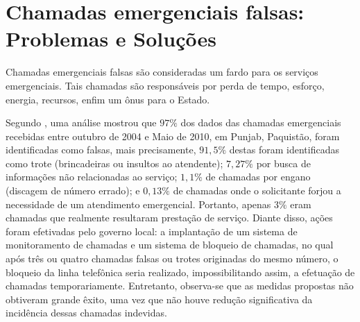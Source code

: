 \section{Chamadas emergenciais falsas: Problemas e Soluções}
Chamadas emergenciais falsas são consideradas um fardo para os serviços emergenciais. Tais chamadas são responsáveis por perda de tempo, esforço, energia, recursos, enfim um ônus para o Estado.

Segundo \cite{waseem2010prank}, uma análise mostrou que $97\%$ dos dados das chamadas emergenciais recebidas entre outubro de 2004 e Maio de 2010, em Punjab, Paquistão, foram identificadas como falsas, mais precisamente, $91,5\%$ destas foram identificadas como trote (brincadeiras ou insultos ao atendente); $7,27\%$ por busca de informações não relacionadas ao serviço; $1,1\%$ de chamadas por engano (discagem de número errado); e $0,13\%$ de chamadas onde o solicitante forjou a necessidade de um atendimento emergencial. Portanto, apenas $3\%$ eram chamadas que realmente resultaram prestação de serviço.
Diante disso, ações foram efetivadas pelo governo local: a implantação de um sistema de monitoramento de chamadas e um sistema de bloqueio de chamadas, no qual após três ou quatro chamadas falsas ou trotes originadas do mesmo número, o bloqueio da linha telefônica seria realizado, impossibilitando assim, a efetuação de chamadas temporariamente.
Entretanto, observa-se que as medidas propostas não obtiveram grande êxito, uma vez que não houve redução significativa da incidência dessas chamadas indevidas.

